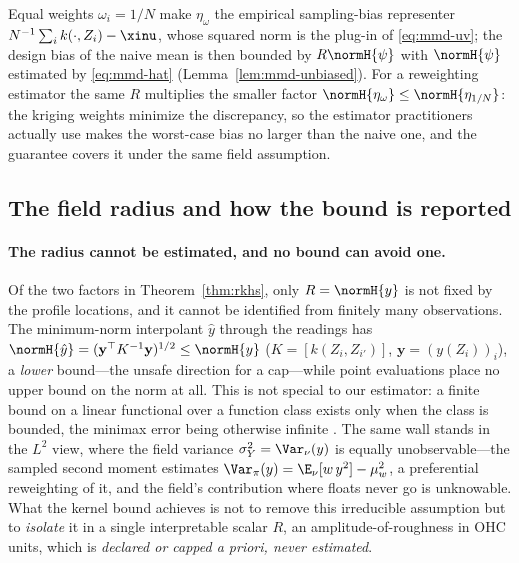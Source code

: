 Equal weights $\omega_i=1/N$ make $\eta_\omega$ the empirical sampling-bias
representer $N^{-1}\sum_i k(\cdot,Z_i)-\xinu$, whose squared norm is the
plug-in of \eqref{eq:mmd-uv}; the design bias of the naive mean is then bounded
by $R\normH{\psi}$ with $\normH{\psi}$ estimated by \eqref{eq:mmd-hat}
(Lemma~\ref{lem:mmd-unbiased}). For a reweighting estimator the same $R$
multiplies the smaller factor $\normH{\eta_\omega}\le\normH{\eta_{1/N}}$: the
kriging weights minimize the discrepancy, so the estimator practitioners
actually use makes the worst-case bias no larger than the naive one, and the
guarantee covers it under the same field assumption.

\subsection{The field radius and how the bound is reported}
\label{sec:rkhs-radius}

\paragraph{The radius cannot be estimated, and no bound can avoid one.}
Of the two factors in Theorem~\ref{thm:rkhs}, only $R=\normH{y}$ is not fixed by
the profile locations, and it cannot be identified from finitely many
observations. The minimum-norm interpolant $\hat y$ through the readings has
$\normH{\hat y}=(\mathbf y^\top K^{-1}\mathbf y)^{1/2}\le\normH{y}$
($K=[k(Z_i,Z_{i'})]$, $\mathbf y=(y(Z_i))_i$), a \emph{lower} bound---the unsafe
direction for a cap---while point evaluations place no upper bound on the norm at
all. This is not special to our estimator: a finite bound on a linear functional
over a function class exists only when the class is bounded, the minimax error
being otherwise infinite \citep{donoho1994,micchelli1977}. The same wall stands
in the $L^2$ view, where the field variance $\sigma_Y^2=\Var_\nu(y)$ is equally
unobservable---the sampled second moment estimates
$\Var_\pi(y)=\E_\nu[w\,y^2]-\mu_w^2$, a preferential reweighting of it, and the
field's contribution where floats never go is unknowable. What the kernel bound
achieves is not to remove this irreducible assumption but to \emph{isolate} it in
a single interpretable scalar $R$, an amplitude-of-roughness in OHC units, which
is \emph{declared or capped a priori, never estimated}.

